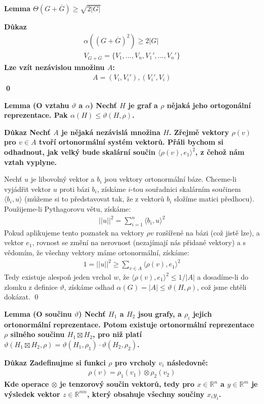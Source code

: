 \documentclass[a4paper,12pt,titlepage]{article}
\newcommand{\shn}{\Theta}
\newcommand{\lm}{\smallskip\noindent\bf Lemma\rm{} }
\newcommand{\dk}{\smallskip\noindent\bf Důkaz\rm{} }
\newcommand{\R}{\mathbb{R}}
\newcommand{\sk}[1]{\langle #1\rangle}
\begin{document}
\lm $\shn(G + \overline{G}) \geq \sqrt{2|G|}$

\dk 
\begin{align}
	\alpha ((G+\overline G)^2) \geq 2|G| \\
	V_{G+\overline G} = \{ V_1, ..., V_n, V_1', ..., V_n'\}
\end{align}
Lze vzít nezávislou množinu $A$:
\begin{align}
	A = (V_i, V_i'), (V_i', V_i)
\end{align}
\qed

\lm (O vztahu $\vartheta$ a $\alpha$) Nechť $H$ je graf a $\rho$ nějaká jeho ortogonální reprezentace. Pak $\alpha(H) \leq \vartheta(H, \rho)$.

\dk Nechť $A$ je nějaká nezávislá množina $H$. Zřejmě vektory $\rho(v)$ pro $v \in A$ tvoří ortonormální systém vektorů. Přáli bychom si odhadnout, jak velký bude skalární součin $\sk{\rho(v),e_1}^2$, z čehož nám vztah vyplyne.

Nechť $u$ je libovolný vektor a $b_i$ jsou vektory ortonormální báze. Chceme-li vyjádřit vektor $u$ proti bázi $b_i$, získáme $i$-tou souřadnici skalárním součinem $\sk{b_i,u}$ (můžeme si to představovat tak, že z vektorů $b_i$ složíme matici předhocu). Použijeme-li Pythagorovu větu, získáme:
\begin{align}
	||u||^2 = \sum_{i=1}^n \sk{b_i,u}^2
\end{align}
Pokud aplikujeme tento poznatek na vektory $\rho{v}$ rozšířené na bázi (což jistě lze), a vektor $e_1$, rovnost se změní na nerovnost (nezajímají nás přidané vektory) a s vědomím, že všechny vektory máme ortonormální, získáme:
\begin{align}
	1=||u||^2 \geq \sum_{v\in A}\sk{\rho(v),e_1}^2
\end{align}
Tedy existuje alespoň jeden vrchol $w$, že $\sk{\rho(v),e_1}^2 \leq 1/|A|$ a dosadíme-li do zlomku z definice $\vartheta$, získáme odhad $ \alpha(G) = |A| \leq\vartheta(H,\rho)$, což jsme chtěli dokázat. \qed



\lm (O součinu $\vartheta$) Nechť $H_1$ a $H_2$ jsou grafy, a $\rho_i$ jejich 
ortonormální reprezentace. Potom existuje ortonormální reprezentace $\rho$ 
silného součinu $H_1 \boxtimes H_2$, pro niž platí $\vartheta(H_1 \boxtimes H_2, 
\rho) = \vartheta(H_1, \rho_1) \cdot \vartheta(H_2,\rho_2)$.

\dk Zadefinujme si funkci $\rho$ pro vrcholy $v_i$ následovně:
\begin{align}
	\rho(v) = \rho_1(v_1) \otimes \rho_2(v_2)
\end{align}
Kde operace $\otimes$ je tenzorový součin vektorů, tedy pro $x \in \R^n$ a $y 
\in \R^m$ je výsledek vektor $z \in \R^{mn}$, který obsahuje všechny součiny 
$x_iy_i$. 
\end{document}
